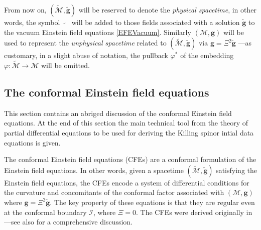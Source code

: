 \documentclass[10pt,a4paper]{article}
\theoremstyle{plain}
\def\bmg{{\bm g}}
\begin{document}
From now on, $(\tilde{\mathcal{M}},\tilde{\bmg})$ will be reserved to
denote the \emph{physical spacetime}, in other words, the symbol
$\tilde{ \quad}$ will be added to those fields associated with a
solution $\tilde{\bmg}$ to the vacuum Einstein field equations
\eqref{EFEVacuum}.  Similarly $(\mathcal{M},\bmg)$ will be used to
represent the \emph{unphysical spacetime} related to
$(\tilde{\mathcal{M}},\tilde{\bmg})$ via $\bmg=\Xi^2\tilde{\bmg}$
---as customary, in a slight abuse of notation, the pullback $\varphi^*$ of the
 embedding
$\varphi:
\tilde{\mathcal{M}}\rightarrow\mathcal{M}$ will be omitted.



\subsection{The  conformal Einstein field equations}
\label{Sec:CFEs}

This section contains an abriged discussion of the conformal Einstein
field equations.  At the end of this section the main technical
tool from the theory of partial
differential equations to be used for deriving the Killing spinor
intial data equations is given.

\medskip
 

The conformal Einstein field equations (CFEs) are a conformal
formulation of the Einstein field equations. In other words, given a
spacetime $(\tilde{\mathcal{M}},\tilde{\bmg})$ satisfying the Einstein
field equations, the CFEs
encode a system of differential conditions for the curvature and
concomitants of the conformal factor associated with
$(\mathcal{M},\bmg)$ where $\bmg=\Xi^2\tilde{\bmg}$. The key property
of these equations is that they are regular even at the conformal
boundary $\mathscr{I}$, where $\Xi=0$.  The CFEs were derived originally
in \cite{Fri81a} ---see also \cite{CFEbook} for a
comprehensive discussion.

\medskip
\end{document}
